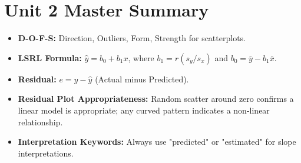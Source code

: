 \section{Unit 2 Master Summary}
\begin{lessonbox}
\begin{itemize}[leftmargin=1.2em]
  \item \textbf{D-O-F-S:} Direction, Outliers, Form, Strength for scatterplots.
  \item \textbf{LSRL Formula:} $\hat{y} = b_0 + b_1 x$, where $b_1 = r(s_y/s_x)$ and $b_0 = \bar{y} - b_1\bar{x}$.
  \item \textbf{Residual:} $e = y - \hat{y}$ (Actual minus Predicted).
  \item \textbf{Residual Plot Appropriateness:} Random scatter around zero confirms a linear model is appropriate; any curved pattern indicates a non-linear relationship.
  \item \textbf{Interpretation Keywords:} Always use "predicted" or "estimated" for slope interpretations.
\end{itemize}
\end{lessonbox}
\clearpage
